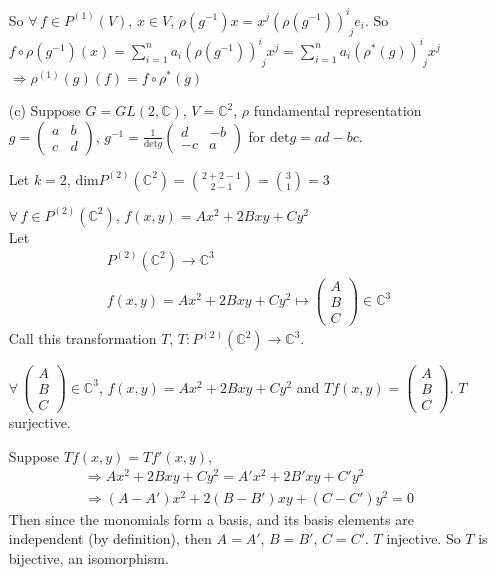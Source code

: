 \documentclass[10pt]{amsart}
\begin{document}
\begin{multicols*}{2}
\begin{enumerate}
	So $\forall \, f \in P^{(1)}(V)$, $x\in V$, $\rho(g^{-1})x = x^j(\rho(g^{-1}))^i_{\,\,j} e_i$.  So $f\circ \rho(g^{-1})(x) = \sum_{i=1}^n a_i(\rho(g^{-1}))^i_{\,\,j} x^j = \sum_{i=1}^n a_i(\rho^*(g))^i_{\,\,j} x^j$ \\
	$\Longrightarrow \rho^{(1)}(g)(f) = f\circ \rho^*(g)$
	\item[(c)] Suppose $G= GL(2,\mathbb{C})$, $V=\mathbb{C}^2$, $\rho$ fundamental representation $g= \left( \begin{matrix} a & b \\
	c & d \end{matrix} \right)$, $g^{-1} = \frac{1}{\text{det}g} \left( \begin{matrix} d & -b \\
	-c & a \end{matrix} \right)$ for $\text{det}g = ad-bc$.  
	
	Let $k=2$, $\text{dim}P^{(2)}(\mathbb{C}^2) = \binom{2+2-1}{2-1} = \binom{3}{1} = 3$
	
	$\forall \, f \in P^{(2)}(\mathbb{C}^2)$, $f(x,y) = Ax^2 + 2Bxy + Cy^2$ \\
	Let 
	\[
	\begin{gathered}
	P^{(2)}(\mathbb{C}^2) \to \mathbb{C}^3 \\ 
	f(x,y) = Ax^2 + 2Bxy + Cy^2 \mapsto \left( \begin{matrix} A \\ B \\ C \end{matrix} \right) \in \mathbb{C}^3
	\end{gathered}
	\]
	Call this transformation $T$, $T: P^{(2)}(\mathbb{C}^2) \to \mathbb{C}^3$.  
	
	$\forall \, \left( \begin{matrix} A \\ B \\ C \end{matrix} \right) \in \mathbb{C}^3$, $f(x,y) = Ax^2 + 2Bxy + Cy^2$ and $Tf(x,y) = \left( \begin{matrix} A \\ B \\ C \end{matrix} \right)$.  $T$ surjective.  
	
	Suppose $Tf(x,y) = Tf'(x,y)$, 
	\[
	\begin{gathered}
	\Longrightarrow Ax^2 + 2Bxy + Cy^2 = A'x^2 + 2B'xy + C'y^2 \\ 
	\Longrightarrow (A-A')x^2 + 2(B-B')xy + (C-C')y^2 = 0
	\end{gathered}
	\]
	Then since the monomials form a basis, and its basis elements are independent (by definition), then $A=A'$, $B=B'$, $C=C'$.  $T$ injective.  So $T$ is bijective, an isomorphism.  
	

\end{enumerate}
\end{multicols*}
\end{document}
